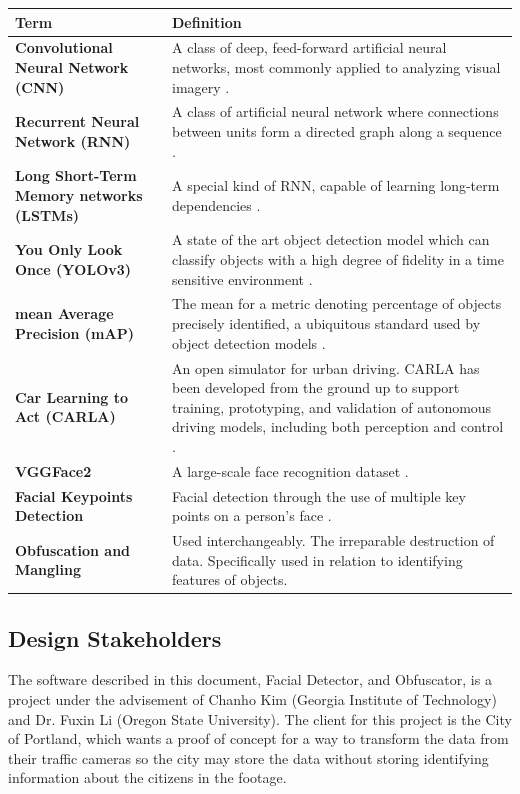 \documentclass[onecolumn, draftclsnofoot,10pt, compsoc]{IEEEtran}
\begin{document}
\begin{center}
  \begin{tabular}{ | l | p{10cm} | } 
    \hline \textbf{Term} & \textbf{Definition} \\ \hline
    \textbf{Convolutional Neural Network (CNN)} & A class of deep, feed-forward artificial neural networks, most commonly applied to analyzing visual imagery \cite{CNN}. \\ \hline
    \textbf{Recurrent Neural Network (RNN)} & A class of artificial neural network where connections between units form a directed graph along a sequence \cite{RNN}. \\ \hline
    \textbf{Long Short-Term Memory networks (LSTMs)} & A special kind of RNN, capable of learning long-term dependencies \cite{LSTMs}. \\ \hline
    \textbf{You Only Look Once (YOLOv3)} & A state of the art object detection model which can classify objects with a high degree of fidelity in a time sensitive environment \cite{YOLOv3}. \\ \hline
    \textbf{mean Average Precision (mAP)} & The mean for a metric denoting percentage of objects precisely identified, a ubiquitous standard used by object detection models \cite{YOLOv3}. \\ \hline
    \textbf{Car Learning to Act (CARLA)} & An open simulator for urban driving. CARLA has been developed from the ground up to support training, prototyping, and validation of autonomous driving models, including both perception and control \cite{Carla}. \\ \hline 
    \textbf{VGGFace2} & A large-scale face recognition dataset \cite{VGGFace2}. \\ \hline 
    \textbf{Facial Keypoints Detection} & Facial detection through the use of multiple key points on a person's face \cite{VGGFace2}. \\ \hline
    \textbf{Obfuscation and Mangling} & Used interchangeably. The irreparable destruction of data. Specifically used in relation to identifying features of objects. \\ \hline
  \end{tabular}
\end{center}
\subsection{Design Stakeholders}
The software described in this document, Facial Detector, and Obfuscator, is a project under the advisement of Chanho Kim (Georgia Institute of Technology) and Dr. Fuxin Li (Oregon State University). The client for this project is the City of Portland, which wants a proof of concept for a way to transform the data from their traffic cameras so the city may store the data without storing identifying information about the citizens in the footage.
\end{document}
